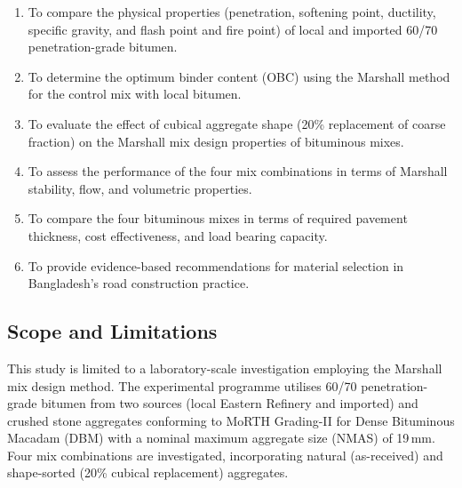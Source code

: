 \documentclass[12pt,a4paper]{article}
\begin{document}
\begin{enumerate}[label=\roman*.]
    \item To compare the physical properties (penetration, softening point, ductility, specific gravity, and flash point and fire point) of local and imported 60/70 penetration-grade bitumen.
    \item To determine the optimum binder content (OBC) using the Marshall method for the control mix with local bitumen.
    \item To evaluate the effect of cubical aggregate shape (20\% replacement of coarse fraction) on the Marshall mix design properties of bituminous mixes.
    \item To assess the performance of the four mix combinations in terms of Marshall stability, flow, and volumetric properties.
    \item To compare the four bituminous mixes in terms of required pavement thickness, cost effectiveness, and load bearing capacity.
    \item To provide evidence-based recommendations for material selection in Bangladesh's road construction practice.
\end{enumerate}

\subsection{Scope and Limitations}

This study is limited to a laboratory-scale investigation employing the Marshall mix design method. The experimental programme utilises 60/70 penetration-grade bitumen from two sources (local Eastern Refinery and imported) and crushed stone aggregates conforming to MoRTH Grading-II for Dense Bituminous Macadam (DBM) with a nominal maximum aggregate size (NMAS) of 19\,mm. Four mix combinations are investigated, incorporating natural (as-received) and shape-sorted (20\% cubical replacement) aggregates.
\end{document}
